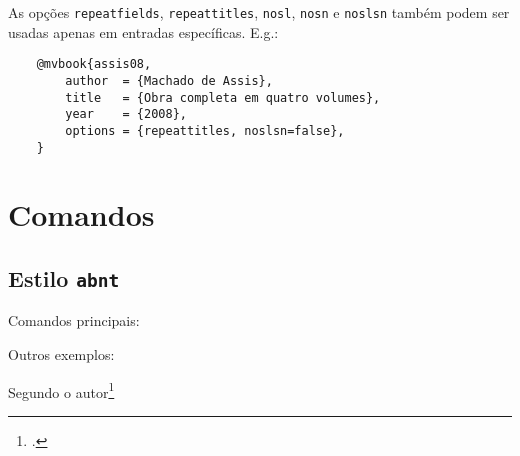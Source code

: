 \documentclass[a4paper]{article}
\begin{document}
As opções \texttt{repeatfields}, \texttt{repeattitles}, \texttt{nosl},
\texttt{nosn} e \texttt{noslsn} também podem ser usadas apenas em entradas
específicas. E.g.:

\begin{verbatim}
    @mvbook{assis08,
        author  = {Machado de Assis},
        title   = {Obra completa em quatro volumes},
        year    = {2008},
        options = {repeattitles, noslsn=false},
    }
\end{verbatim}

\clearpage
\section{Comandos}%
\label{sec:comandos}

\subsection{Estilo \texttt{abnt}}%

Comandos principais:

\begin{example}
\cite{amaral15}
\end{example}

\begin{example}
\textcite{bosi08}
\end{example}

\begin{example}
\end{example}

\begin{example}
\cites{moretti09}{mann09}{amaral15}
\end{example}

\begin{example}
\textcites{moretti09}{mann09}{amaral15}
\end{example}

Outros exemplos:

\begin{example}
Segundo o autor\footcite{assis08}
\end{example}

\begin{example}
\end{example}

\begin{example}
\citeauthor{bosi08}
\end{example}

\begin{example}
\citeyear{bosi08}
\end{example}
\end{document}
